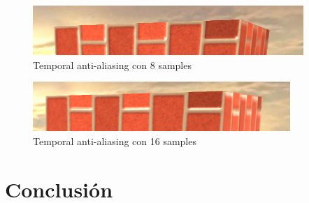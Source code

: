 \documentclass[withindex, glossary]{cam-thesis}
\begin{document}
\begin{figure}
    \includegraphics[width=\linewidth]{figures/taa8.png}
    \caption{Temporal anti-aliasing con 8 samples}
\end{figure}

\begin{figure}
    \includegraphics[width=\linewidth]{figures/taa16.png}
    \caption{Temporal anti-aliasing con 16 samples}
\end{figure}

\chapter{Conclusión}

\nocite{*}
\printbibliography{}

\listoffigures
\listoftables

\printthesisindex{}
\end{document}
